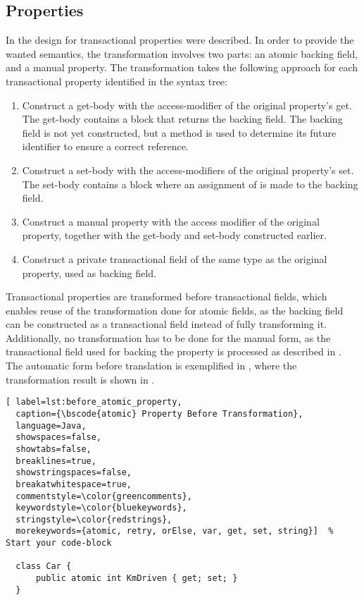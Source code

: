 \subsection{Properties}\label{sec:roslyn_extension_properties}
In  the design for transactional properties were described. In order to provide the wanted semantics, the transformation involves two parts: an atomic backing field, and a manual property. The transformation takes the following approach for each transactional property identified in the syntax tree:

\begin{enumerate}
	\item Construct a get-body with the access-modifier of the original property's get. The get-body contains a block that returns the backing field. The backing field is not yet constructed, but a method is used to determine its future identifier to ensure a correct reference.
	\item Construct a set-body with the access-modifiers of the original property's set. The set-body contains a block where an assignment of  is made to the backing field.
	\item Construct a manual property with the access modifier of the original property, together with the get-body and set-body constructed earlier.
	\item Construct a private transactional field of the same type as the original property, used as backing field.
\end{enumerate}

Transactional properties are transformed before transactional fields, which enables reuse of the transformation done for atomic fields, as the backing field can be constructed as a transactional field instead of fully transforming it. Additionally, no transformation has to be done for the manual form, as the transactional field used for backing the property is processed as described in . The automatic form before translation is exemplified in , where the transformation result is shown in .

\begin{lstlisting}[ label=lst:before_atomic_property,
  caption={\bscode{atomic} Property Before Transformation},
  language=Java,  
  showspaces=false,
  showtabs=false,
  breaklines=true,
  showstringspaces=false,
  breakatwhitespace=true,
  commentstyle=\color{greencomments},
  keywordstyle=\color{bluekeywords},
  stringstyle=\color{redstrings},
  morekeywords={atomic, retry, orElse, var, get, set, string}]  % Start your code-block

  class Car {
      public atomic int KmDriven { get; set; }
  }
\end{lstlisting}

